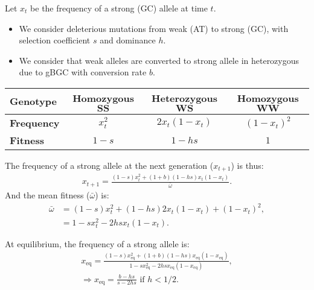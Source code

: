\documentclass[8pt,aspectratio=169]{beamer}
\begin{document}
    \begin{frame}
        Let $x_{t}$ be the frequency of a strong (GC) allele at time $t$.
        \begin{itemize}
            [label=$\bullet$]
            \item We consider deleterious mutations from weak (AT) to strong (GC), with selection coefficient $s$ and dominance $h$.
            \item We consider that weak alleles are converted to strong allele in heterozygous due to gBGC with conversion rate $b$.
        \end{itemize}
        \begin{center}
            \begin{tabu}{|l||c|c|c|}
                \hline
                \textbf{Genotype}  & \textbf{Homozygous} $\bm{SS}$ & \textbf{Heterozygous} $\bm{WS}$ & \textbf{Homozygous} $\bm{WW}$ \\ \hline
                \textbf{Frequency} & $x_{t}^2$                     & $2x_{t}(1-x_{t})$               & $(1 - x_{t})^2$               \\ \hline
                \textbf{Fitness}   & $1-s$                         & $1-h s$                         & $1$                           \\ \hline
            \end{tabu}
        \end{center}
        The frequency of a strong allele at the next generation ($x_{t+1}$) is thus:
        \begin{align*}
            x_{t+1} = \frac{(1 - s)x_{t}^2 + (1 + b)(1 - h s)x_{t} (1 - x_{t})}{\bar{\omega}}.
        \end{align*}
        And the mean fitness ($\bar{\omega}$) is:
        \begin{align*}
            \bar{\omega} & = (1 - s)x_{t}^2 + (1 - h s) 2 x_{t} (1 - x_{t}) + (1 - x_{t})^2, \\
            & = 1 - s x_{t}^2 - 2 h s x_{t} (1 - x_{t}).
        \end{align*}
    \end{frame}
    \begin{frame}
        At equilibrium, the frequency of a strong allele is:
        \begin{gather*}
            x_{\text{eq}} = \frac{(1 - s) x_{\text{eq}}^2 + (1 + b)(1 - h s) x_{\text{eq}} (1 -  x_{\text{eq}})}{1 - s x_{\text{eq}}^2 - 2 h s x_{\text{eq}} (1 -  x_{\text{eq}})}, \\
            \Rightarrow x_{\text{eq}} = \frac{b-h s}{s-2h s} \text{ if } h < 1/2.
        \end{gather*}
    \end{frame}
\end{document}
